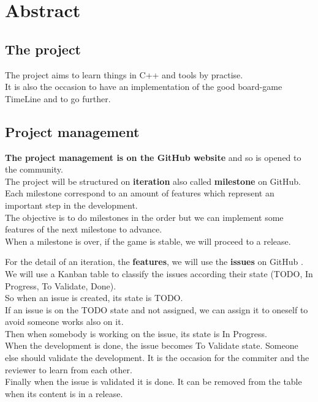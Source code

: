 \documentclass[12pt,a4paper,twoside]{article}
\begin{document}
\newpage
\tableofcontents
\newpage

\section{Abstract}

\subsection{The project}
The project aims to learn things in C++ and tools by practise.\\
It is also the occasion to have an implementation of the good board-game TimeLine and to go further.

\subsection{Project management}
\textbf{The project management is on the GitHub website} and so is opened to the community.\\
The project will be structured on \textbf{iteration} also called \textbf{milestone} on GitHub. Each milestone correspond to an amount of features which represent an important step in the development.\\
The objective is to do milestones in the order but we can implement some features of the next milestone to advance.\\
When a milestone is over, if the game is stable, we will proceed to a release.

\vspace{5mm}

For the detail of an iteration, the \textbf{features}, we will use the \textbf{issues} on GitHub .\\
We will use a Kanban table to classify the issues according their state (TODO, In Progress, To Validate, Done).\\
So when an issue is created, its state is TODO.\\
If an issue is on the TODO state and not assigned, we can assign it to oneself to avoid someone works also on it.\\
Then when somebody is working on the issue, its state is In Progress.\\
When the development is done, the issue becomes To Validate state. Someone else should validate the development. It is the occasion for the commiter and the reviewer to learn from each other.\\
Finally when the issue is validated it is done. It can be removed from the table when its content is in a release.
\end{document}

